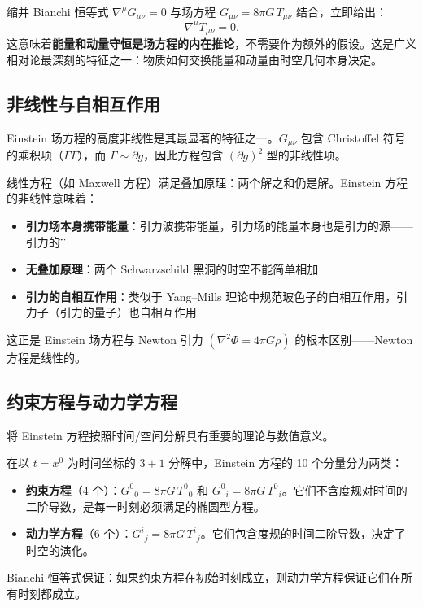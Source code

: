 \begin{note}[能量-动量自动守恒]
缩并 Bianchi 恒等式 $\nabla^\mu G_{\mu\nu} = 0$ 与场方程 $G_{\mu\nu} = 8\pi G\,T_{\mu\nu}$ 结合，立即给出：
\begin{equation}
    \boxed{\nabla^\mu T_{\mu\nu} = 0}.
\end{equation}
这意味着\textbf{能量和动量守恒是场方程的内在推论}，不需要作为额外的假设。这是广义相对论最深刻的特征之一：物质如何交换能量和动量由时空几何本身决定。
\end{note}

\subsection{非线性与自相互作用}

Einstein 场方程的高度非线性是其最显著的特征之一。$G_{\mu\nu}$ 包含 Christoffel 符号的乘积项（$\Gamma\Gamma$），而 $\Gamma \sim \partial g$，因此方程包含 $(\partial g)^2$ 型的非线性项。

\begin{note}[非线性的物理意义]
线性方程（如 Maxwell 方程）满足叠加原理：两个解之和仍是解。Einstein 方程的非线性意味着：
\begin{itemize}
    \item \textbf{引力场本身携带能量}：引力波携带能量，引力场的能量本身也是引力的源——引力的\"引力\" 
    \item \textbf{无叠加原理}：两个 Schwarzschild 黑洞的时空不能简单相加
    \item \textbf{引力的自相互作用}：类似于 Yang--Mills 理论中规范玻色子的自相互作用，引力子（引力的量子）也自相互作用
\end{itemize}
这正是 Einstein 场方程与 Newton 引力 $(\nabla^2\Phi = 4\pi G\rho)$ 的根本区别——Newton 方程是线性的。
\end{note}

\subsection{约束方程与动力学方程}

将 Einstein 方程按照时间/空间分解具有重要的理论与数值意义。

\begin{property}[$3+1$ 分解]
在以 $t = x^0$ 为时间坐标的 $3+1$ 分解中，Einstein 方程的 10 个分量分为两类：
\begin{itemize}
    \item \textbf{约束方程}（4 个）：$G^0{}_0 = 8\pi G\,T^0{}_0$ 和 $G^0{}_i = 8\pi G\,T^0{}_i$。它们不含度规对时间的二阶导数，是每一时刻必须满足的椭圆型方程。
    \item \textbf{动力学方程}（6 个）：$G^i{}_j = 8\pi G\,T^i{}_j$。它们包含度规的时间二阶导数，决定了时空的演化。
\end{itemize}
Bianchi 恒等式保证：如果约束方程在初始时刻成立，则动力学方程保证它们在所有时刻都成立。
\end{property}

